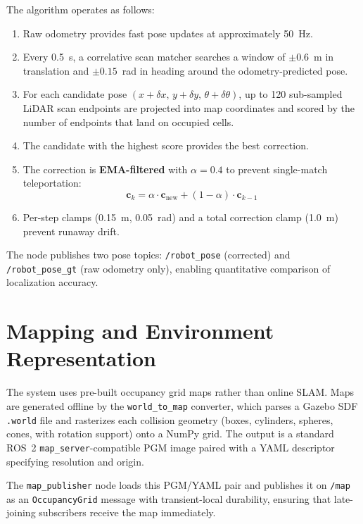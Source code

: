 \documentclass[a4paper]{article}
\begin{document}
The algorithm operates as follows:

\begin{enumerate}
    \item Raw odometry provides fast pose updates at approximately 50~Hz.
    \item Every 0.5~s, a correlative scan matcher searches a window of $\pm 0.6$~m in translation and $\pm 0.15$~rad in heading around the odometry-predicted pose.
    \item For each candidate pose $(x + \delta x, \, y + \delta y, \, \theta + \delta\theta)$, up to 120 sub-sampled LiDAR scan endpoints are projected into map coordinates and scored by the number of endpoints that land on occupied cells.
    \item The candidate with the highest score provides the best correction.
    \item The correction is \textbf{EMA-filtered} with $\alpha = 0.4$ to prevent single-match teleportation:
    \begin{equation}
        \mathbf{c}_k = \alpha \cdot \mathbf{c}_{\text{new}} + (1 - \alpha) \cdot \mathbf{c}_{k-1}
    \end{equation}
    \item Per-step clamps (0.15~m, 0.05~rad) and a total correction clamp (1.0~m) prevent runaway drift.
\end{enumerate}

The node publishes two pose topics: \texttt{/robot\_pose} (corrected) and \texttt{/robot\_pose\_gt} (raw odometry only), enabling quantitative comparison of localization accuracy.


\section{Mapping and Environment Representation}

The system uses pre-built occupancy grid maps rather than online SLAM. Maps are generated offline by the \texttt{world\_to\_map} converter, which parses a Gazebo SDF \texttt{.world} file and rasterizes each collision geometry (boxes, cylinders, spheres, cones, with rotation support) onto a NumPy grid. The output is a standard ROS~2 \texttt{map\_server}-compatible PGM image paired with a YAML descriptor specifying resolution and origin.

The \texttt{map\_publisher} node loads this PGM/YAML pair and publishes it on \texttt{/map} as an \texttt{OccupancyGrid} message with transient-local durability, ensuring that late-joining subscribers receive the map immediately.
\end{document}
